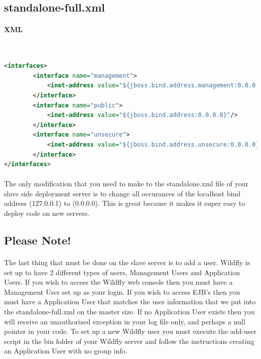 \documentclass[
10pt, %
letterpaper, %
oneside, %
headinclude,footinclude, %
BCOR5mm, %
]{scrartcl}
\begin{document}


\subsection{standalone-full.xml}


\paragraph{XML}~
\begin{lstlisting}[language=XML]
<interfaces>
        <interface name="management">
            <inet-address value="${jboss.bind.address.management:0.0.0.0}"/>
        </interface>
        <interface name="public">
            <inet-address value="${jboss.bind.address:0.0.0.0}"/>
        </interface>
        <interface name="unsecure">
            <inet-address value="${jboss.bind.address.unsecure:0.0.0.0}"/>
        </interface>
</interfaces>
\end{lstlisting}
 
\paragraph{} The only modification that you need to make to the standalone.xml file of your slave side deployment server is to change all occurances of the localhost bind address (127.0.0.1) to (0.0.0.0). This is great because it makes it super easy to deploy code on new servers.


\subsection{Please Note!}


\paragraph{} The last thing that must be done on the slave server is to add a user. Wildfly is set up to have 2 different types of users, Management Users and Application Users. If you wish to access the Wildfly web console then you must have a Management User set up as your login. If you wish to access EJB's then you must have a Application User that matches the user information that we put into the standalone-full.xml on the master size. If no Application User exists then you will receive an unauthorized exception in your log file only, and perhaps a null pointer in your code. To set up a new Wildfly user you must execute the add-user script in the bin folder of your Wildfly server and follow the instructions creating an Application User with no group info.
\end{document}
